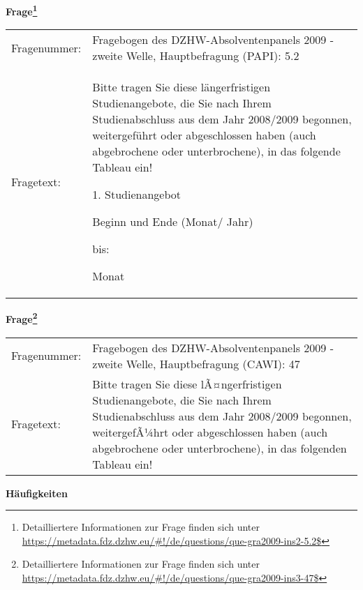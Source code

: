 				\vspace*{0.5cm}
                \noindent\textbf{Frage\footnote{Detailliertere Informationen zur Frage finden sich unter
		              \url{https://metadata.fdz.dzhw.eu/\#!/de/questions/que-gra2009-ins2-5.2$}}}\\
				\begin{tabularx}{\hsize}{@{}lX}
					Fragenummer: &
					  Fragebogen des DZHW-Absolventenpanels 2009 - zweite Welle, Hauptbefragung (PAPI):
					  5.2
 \\
					Fragetext: & Bitte tragen Sie diese längerfristigen Studienangebote, die Sie nach Ihrem Studienabschluss aus dem Jahr 2008/2009 begonnen, weitergeführt oder abgeschlossen haben (auch abgebrochene oder unterbrochene), in das folgende Tableau ein!\par  1. Studienangebot\par  Beginn und Ende (Monat/ Jahr)\par  bis:\par  Monat \\
				\end{tabularx}
				\vspace*{0.5cm}
                \noindent\textbf{Frage\footnote{Detailliertere Informationen zur Frage finden sich unter
		              \url{https://metadata.fdz.dzhw.eu/\#!/de/questions/que-gra2009-ins3-47$}}}\\
				\begin{tabularx}{\hsize}{@{}lX}
					Fragenummer: &
					  Fragebogen des DZHW-Absolventenpanels 2009 - zweite Welle, Hauptbefragung (CAWI):
					  47
 \\
					Fragetext: & Bitte tragen Sie diese lÃ¤ngerfristigen Studienangebote, die Sie nach Ihrem Studienabschluss aus dem Jahr 2008/2009 begonnen, weitergefÃ¼hrt oder abgeschlossen haben (auch abgebrochene oder unterbrochene), in das folgenden Tableau ein! \\
				\end{tabularx}





        		\vspace*{0.5cm}
                \noindent\textbf{Häufigkeiten}

